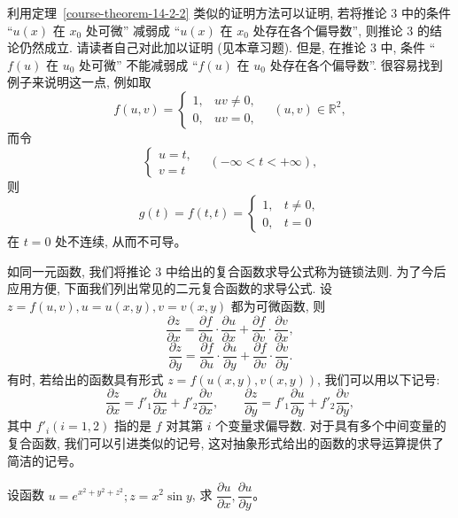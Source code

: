 \documentclass[12pt,fontset=fandol]{ctexart}
\begin{document}
\begin{remark}\quad 利用定理~\ref{course-theorem-14-2-2}  类似的证明方法可以证明, 若将推论 3 中的条件 ``$u(x)$ 在 $x_0$ 处可微'' 减弱成 ``$u(x)$ 在 $x_0$ 处存在各个偏导数'', 则推论 3 的结论仍然成立. 请读者自己对此加以证明 (见本章习题). 但是, 在推论 3 中, 条件 ``$f(u)$ 在 $u_0$ 处可微'' 不能减弱成 ``$f(u)$ 在 $u_0$ 处存在各个偏导数''. 很容易找到例子来说明这一点, 例如取
\[
  f(u,v)=
  \begin{cases}
    1, &uv\ne0,\\
    0, &uv=0,
  \end{cases}
  \quad (u,v)\in\mathbb R^2,
\]
而令
\[
  \begin{cases}
    u=t,\\
    v=t
  \end{cases}
  \quad(-\infty<t<+\infty),
\]
则
\[
  g(t)=f(t,t)=
  \begin{cases}
    1, &t\ne0,\\
    0, &t=0
  \end{cases}
\]
在 $t=0$ 处不连续, 从而不可导。

如同一元函数, 我们将推论 3 中给出的复合函数求导公式称为链锁法则. 为了今后应用方便, 下面我们列出常见的二元复合函数的求导公式. 设 $z=f(u,v), u=u(x,y), v=v(x,y)$ 都为可微函数, 则
\[
  \frac{\partial z}{\partial x}
  =\frac{\partial f}{\partial u}\cdot\frac{\partial u}{\partial x}
  +\frac{\partial f}{\partial v}\cdot\frac{\partial v}{\partial x},
\]
\[
  \frac{\partial z}{\partial y}
  =\frac{\partial f}{\partial u}\cdot\frac{\partial u}{\partial y}
  +\frac{\partial f}{\partial v}\cdot\frac{\partial v}{\partial y}.
\]
有时, 若给出的函数具有形式 $z=f(u(x,y),v(x,y))$, 我们可以用以下记号:
\[
  \frac{\partial z}{\partial x}=f'_1\frac{\partial u}{\partial x}+f'_2\frac{\partial v}{\partial x},
  \qquad
  \frac{\partial z}{\partial y}=f'_1\frac{\partial u}{\partial y}+f'_2\frac{\partial v}{\partial y},
\]
其中 $f'_i(i=1,2)$ 指的是 $f$ 对其第 $i$ 个变量求偏导数. 对于具有多个中间变量的复合函数, 我们可以引进类似的记号, 这对抽象形式给出的函数的求导运算提供了简洁的记号。

\end{remark}
\begin{example}\label{course-example-14-2-1}\quad 设函数 $u=e^{x^2+y^2+z^2}; z=x^2\sin y$, 求 $\dfrac{\partial u}{\partial x}, \dfrac{\partial u}{\partial y}$。

\end{example}
\end{document}
